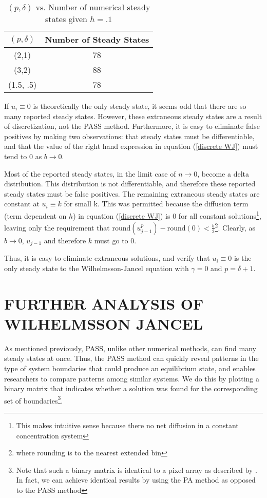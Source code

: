 \documentclass{article}
\begin{document}
\begin{table*}
\begin{center}
\label{WJ Statistics}
\begin{tabular}{ | c | c | }
\hline
$(p, \delta)$ & Number of Steady States \\
\hline
(2,1) & 78 \\
\hline
(3,2) & 88 \\ 
\hline
(1.5, .5) & 78 \\
\hline
\end{tabular}
\setcounter{table}{1}
\caption{$(p, \delta)$ vs. Number of numerical steady states given $h = .1$}
\end{center}
\end{table*}

If $u_i \equiv 0$ is theoretically the only steady state, it seems odd that there are so many reported steady states. However, these extraneous steady states are a result of discretization, not the PASS method. Furthermore, it is easy to eliminate false positives by making two observations: that steady states must be differentiable, and that the value of the right hand expression in equation (\ref{discrete WJ}) must tend to 0 as $b \rightarrow 0$. 

Most of the reported steady states, in the limit case of $n \rightarrow 0$, become a delta distribution. This distribution is not differentiable, and therefore these reported steady states must be false positives. The remaining extraneous steady states are constant at $u_i \equiv k$ for small k. This was permitted because the diffusion term (term dependent on $h$) in equation (\ref{discrete WJ}) is 0 for all constant solutions\footnote{This makes intuitive sense because there no net diffusion in a constant concentration system}, leaving only the requirement that $\text{round}(u_{j-1}^p) - \text{round}(0) < \frac{b}{2}$\footnote{where rounding is to the nearest extended bin}. Clearly, as $b \rightarrow 0$, $u_{j-1}$ and therefore $k$ must go to 0.

Thus, it is easy to eliminate extraneous solutions, and verify that $u_i \equiv 0$ is the only steady state to the Wilhelmsson-Jancel equation with $\gamma = 0$ and $p = \delta + 1$.

\section{FURTHER ANALYSIS OF WILHELMSSON JANCEL}

As mentioned previously, PASS, unlike other numerical methods, can find many steady states at once. Thus, the PASS method can quickly reveal patterns in the type of system boundaries that could produce an equilibrium state, and enables researchers to compare patterns among similar systems. We do this by plotting a binary matrix that indicates whether a solution was found for the corresponding set of boundaries\footnote{Note that such a binary matrix is identical to a pixel array as described by \citep{Introduction_to_PA}. In fact, we can achieve identical results by using the PA method as opposed to the PASS method}.
\end{document}
